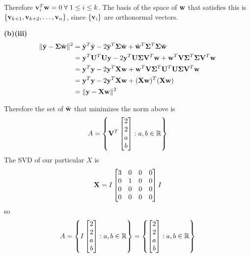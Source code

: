 \documentclass[a4paper, 12pt]{article}
\begin{document}
\begin{solution}
    Therefore $\bfv_i^T \bfw = 0 \forall 1 \leq i \leq k$. The basis of the space of $\mathbf{w}$ that satisfies this is $\{\mathbf{v}_{k+1}, \mathbf{v}_{k+2}, \dots, \mathbf{v}_n\}$, since $\{\mathbf{v}_i\}$ are orthonormal vectors.

    \textbf{(b)(iii)}
    \begin{align*}
        \lVert\tilde{\mathbf{y}} - \mathbf{\Sigma} \tilde{\mathbf{w}}\rVert^2 & = \tilde{\mathbf{y}}^T \tilde{\mathbf{y}} - 2 \tilde{\mathbf{y}}^T \mathbf{\Sigma} \tilde{\mathbf{w}} + \tilde{\mathbf{w}}^T \mathbf{\Sigma}^T \mathbf{\Sigma} \tilde{\mathbf{w}} \\
                                                      & = \mathbf{y}^T \mathbf{U}^T \mathbf{U} \mathbf{y} - 2 \mathbf{y}^T \mathbf{U} \mathbf{\Sigma} \mathbf{V}^T \mathbf{w} + \mathbf{w}^T \mathbf{V} \mathbf{\Sigma}^T \mathbf{\Sigma} \mathbf{V}^T \mathbf{w}             \\
                                                      & = \mathbf{y}^T \mathbf{y} - 2\mathbf{y}^T \mathbf{X} \mathbf{w} + \mathbf{w}^T \mathbf{V} \mathbf{\Sigma}^T \mathbf{U}^T \mathbf{U} \mathbf{\Sigma} \mathbf{V}^T \mathbf{w}                              \\
                                                      & = \mathbf{y}^T \mathbf{y} - 2 \mathbf{y}^T \mathbf{X} \mathbf{w} + (\mathbf{X} \mathbf{w})^T (\mathbf{X} \mathbf{w})                                                           \\
                                                      & = \lVert\mathbf{y} - \mathbf{X} \mathbf{w}\rVert^2
    \end{align*}

    Therefore the set of $\tilde{\mathbf{w}}$ that minimizes the norm above is \[
        A = \left\{\mathbf{V}^T \begin{bmatrix}
            2 \\2 \\ a \\b
        \end{bmatrix}: a, b \in \mathbb{R}\right\}
    \]
    The SVD of our particular $X$ is \[
        \mathbf{X} = I \begin{bmatrix}
            3 & 0 & 0 & 0 \\
            0 & 1 & 0 & 0 \\
            0 & 0 & 0 & 0 \\
            0 & 0 & 0 & 0
        \end{bmatrix}I
    \]
    so \[
        A = \left\{I\begin{bmatrix}
            2 \\2 \\ a \\b
        \end{bmatrix}: a, b \in \mathbb{R}\right\} = \left\{\begin{bmatrix}
            2 \\2 \\ a \\b
        \end{bmatrix}: a, b \in \mathbb{R}\right\}
    \]


\end{solution}
\end{document}
